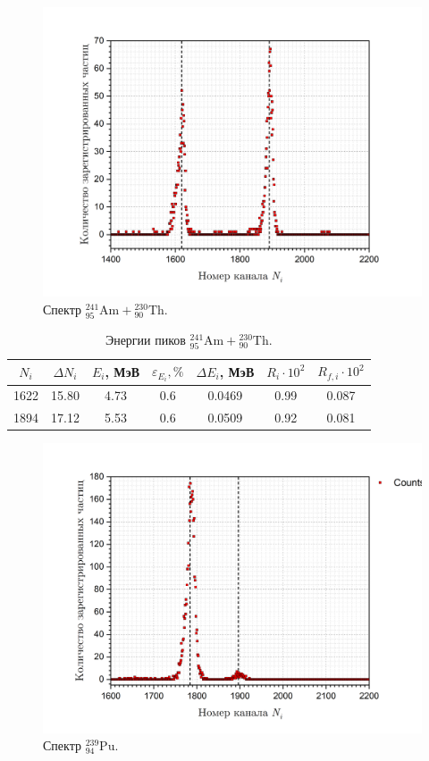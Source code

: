 \documentclass[a4paper, 12pt]{article}
\newcommand{\elem}[3]{{}^{#2}_{#3}\text{#1}}
\newcommand{\Pu}{\elem{Pu}{239}{94}}
\newcommand{\Th}{\elem{Th}{230}{90}}
\newcommand{\Am}{\elem{Am}{241}{95}}
\begin{document}
    \begin{figure}[H]
        \centering
        \includegraphics[width = 12 cm]{images/graph_ThAm.png}
        \caption{Спектр $\Am + \Th$.}
        \label{fig:th_am}
    \end{figure}
	
    \begin{table}[H]
        \centering
        \addtolength{\tabcolsep}{-4pt}
        \footnotesize
        \begin{tabular}{ccccccc}
            \toprule
            $N_i$ & $\Delta N_i$ & $E_i$, МэВ & $\varepsilon_{E_i}, \%$ & $\Delta E_i$, МэВ & $R_i \cdot 10^2$ & $R_{f,i} \cdot 10^2$ \\
            \midrule
            1622 & 15.80 & 4.73 & 0.6 & 0.0469 & 0.99 & 0.087 \\
            1894 & 17.12 & 5.53 & 0.6 & 0.0509 & 0.92 & 0.081 \\
            \bottomrule
        \end{tabular}
        \caption{Энергии пиков $\Am + \Th$.}
        \label{tab:th_am}
    \end{table}
	
    \begin{figure}[H]
        \centering
        \includegraphics[width = 12 cm]{images/graph_pu.png}
        \caption{Спектр $\Pu$.}
        \label{fig:pu}
    \end{figure}
	
\end{document}

